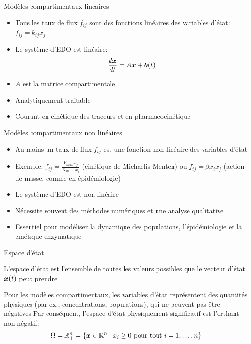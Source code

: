 \documentclass[aspectratio=169]{beamer}\usepackage[]{graphicx}\usepackage[]{xcolor}
\begin{document}
\begin{frame}{Modèles compartimentaux linéaires}
    \begin{itemize}
        \item Tous les taux de flux $f_{ij}$ sont des fonctions linéaires des variables d'état: $f_{ij} = k_{ij}x_j$
        \item Le système d'EDO est linéaire:
        $$ \frac{d\bm{x}}{dt} = A\bm{x} + \bm{b}(t) $$
        \item $A$ est la matrice compartimentale
        \item Analytiquement traitable
        \item Courant en cinétique des traceurs et en pharmacocinétique
    \end{itemize}
\end{frame}

\begin{frame}{Modèles compartimentaux non linéaires}
    \begin{itemize}
        \item Au moins un taux de flux $f_{ij}$ est une fonction non linéaire des variables d'état
        \item Exemple: $f_{ij} = \frac{V_{max} x_j}{K_m + x_j}$ (cinétique de Michaelis-Menten) ou $f_{ij} = \beta x_i x_j$ (action de masse, comme en épidémiologie)
        \item Le système d'EDO est non linéaire
        \item Nécessite souvent des méthodes numériques et une analyse qualitative
        \item Essentiel pour modéliser la dynamique des populations, l'épidémiologie et la cinétique enzymatique
    \end{itemize}
\end{frame}


\begin{frame}{Espace d'état}
    \begin{definition}
        L'espace d'état est l'ensemble de toutes les valeurs possibles que le vecteur d'état $\bm{x}(t)$ peut prendre
    \end{definition}
    \vfill
    Pour les modèles compartimentaux, les variables d'état représentent des quantités physiques (par ex., concentrations, populations), qui ne peuvent pas être négatives
    \vfill
    Par conséquent, l'espace d'état physiquement significatif est l'orthant non négatif:
    $$ \Omega = \mathbb{R}_+^n = \{ \bm{x} \in \mathbb{R}^n : x_i \ge 0 \text{ pour tout } i=1, \dots, n \} $$
\end{frame}
\end{document}
